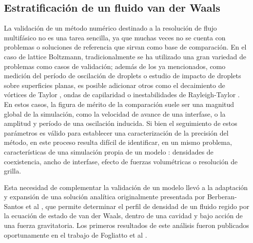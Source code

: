 \subsection{Estratificaci\'on de un fluido van der Waals}

La validaci\'on de un m\'etodo num\'erico destinado a la resoluci\'on de flujo multif\'asico no es una tarea sencilla, ya que muchas veces no se cuenta con problemas o soluciones de referencia que sirvan como base de comparaci\'on. En el caso de lattice Boltzmann, tradicionalmente se ha utilizado una gran variedad de problemas como casos de validaci\'on; adem\'as de los ya mencionados, como medici\'on del per\'iodo de oscilaci\'on de droplets o estudio de impacto de droplets sobre superficies planas, es posible adicionar otros como el decaimiento de v\'ortices de Taylor \cite{guo_discrete_2002}, ondas de capilaridad \cite{mccracken_multiple-relaxation-time_2005} o inestabilidades de Rayleigh-Taylor \cite{li_additional_2012}. En estos casos, la figura de m\'erito de la comparaci\'on suele ser una magnitud global de la simulaci\'on, como la velocidad de avance de una interfase, o la amplitud y per\'iodo de una oscilaci\'on inducida. Si bien el seguimiento de estos par\'ametros es v\'alido para establecer una caracterizaci\'on de la precisi\'on del m\'etodo, en este proceso resulta dif\'icil de identificar, en un mismo problema, caracter\'isticas de una simulaci\'on propia de un modelo \pp{}: densidades de coexistencia, ancho de interfase, efecto de fuerzas volum\'etricas o resoluci\'on de grilla.

Esta necesidad de complementar la validaci\'on de un modelo \pp{} llev\'o a la adaptaci\'on y expansi\'on de una soluci\'on anal\'itica originalmente presentada por Berberan-Santos et al \cite{berberan-santos_liquidvapor_2002}, que permite determinar el perfil de densidad de un fluido regido por la ecuaci\'on de estado de van der Waals, dentro de una cavidad y bajo acci\'on de una fuerza gravitatoria.  Los primeros resultados de este an\'alisis fueron publicados oportunamente en el trabajo de Fogliatto et al \cite{fogliatto_simulation_2019}.

